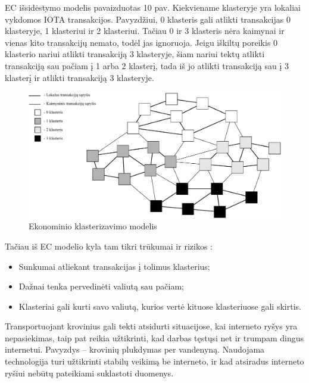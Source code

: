 EC išsidėstymo modelis pavaizduotas 10 pav. Kiekviename klasteryje yra lokaliai vykdomos IOTA transakcijos. Pavyzdžiui, 0 klasteris gali atlikti transakcijas 0 klasteryje, 1 klasteriui ir 2 klasteriui. Tačiau 0 ir 3 klasteris nėra kaimynai ir vienas kito transakcijų nemato, todėl jas ignoruoja. Jeigu iškiltų poreikis 0 klasterio nariui atlikti transakciją 3 klasteryje, šiam nariui tektų atlikti transakciją sau pačiam į 1 arba 2 klasterį, tada iš jo atlikti transakciją sau į 3 klasterį ir atlikti transakciją 3 klasteryje.

\begin{figure}[H]
    \centering
    \includegraphics[scale=0.7]{images/economic-clusters}
    \caption{Ekonominio klasterizavimo modelis}
\end{figure}

Tačiau iš EC modelio kyla tam tikri trūkumai ir rizikos \cite{sergey2018economic}: 
\begin{itemize}
    \item Sunkumai atliekant transakcijas į tolimus klasterius;
    \item Dažnai tenka pervedinėti valiutą sau pačiam;
    \item Klasteriai gali kurti savo valiutą, kurios vertė kituose klasteriuose gali skirtis.
\end{itemize} 





Transportuojant krovinius gali tekti atsidurti situacijose, kai interneto ryšys yra nepasiekimas, taip pat reikia užtikrinti, kad darbas tęstųsi net ir trumpam dingus internetui. Pavyzdys – krovinių plukdymas per vandenyną. Naudojama technologija turi užtikrinti stabilų veikimą be interneto, ir kad atsiradus interneto ryšiui nebūtų pateikiami suklastoti duomenys.

